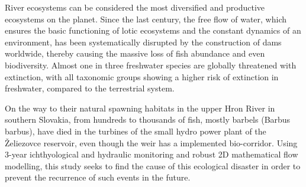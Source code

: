 \noindent

River ecosystems can be considered the most diversified and productive ecosystems on the planet. Since the last century, the free flow of water, which ensures the basic functioning of lotic ecosystems and the constant dynamics of an environment, has been systematically disrupted by the construction of dams worldwide, thereby causing the massive loss of fish abundance and even biodiversity. Almost one in three freshwater species are globally threatened with extinction, with all taxonomic groups showing a higher risk of extinction in freshwater, compared to the terrestrial system.

On the way to their natural spawning habitats in the upper Hron River in southern Slovakia, from hundreds to thousands of fish, mostly barbels (Barbus barbus), have died in the turbines of the small hydro power plant of the Želiezovce reservoir, even though the weir has a implemented bio-corridor. Using 3-year ichthyological and hydraulic monitoring and robust 2D mathematical flow modelling, this study seeks to find the cause of this ecological disaster in order to prevent the recurrence of such events in the future.  

\newpage{}
